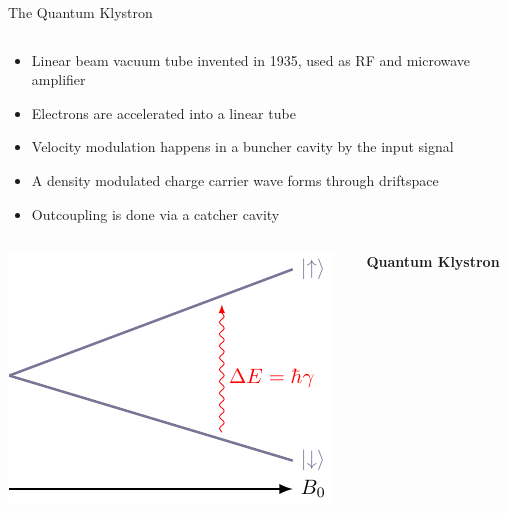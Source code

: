 \documentclass[final]{beamer}
\begin{document}
\begin{frame}[fragile]{}
\begin{columns}[T]
\begin{column}{.49\linewidth}
\begin{block}{\large The Quantum Klystron}
\begin{columns}
\begin{column}{0.6\columnwidth}
            \begin{itemize}
              \item Linear beam vacuum tube invented in 1935, used as RF and microwave amplifier
              \item Electrons are accelerated into a linear tube
              \item Velocity modulation happens in a buncher cavity by the input signal
              \item A density modulated charge carrier wave forms through driftspace
              \item Outcoupling is done via a catcher cavity
            \end{itemize}
          \end{column}
        \end{columns}
        \begin{columns}
          \begin{column}{0.4\columnwidth}
            \includegraphics[width=\columnwidth]{figures/zeeman.pdf}
          \end{column}
          \begin{column}{0.6\columnwidth}
            \begin{center}
              {\large \textbf{Quantum Klystron}}
            \end{center}


\end{column}
\end{columns}
\end{block}
\end{column}
\end{columns}
\end{frame}
\end{document}
